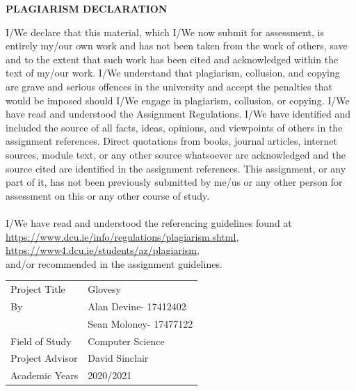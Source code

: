 \documentclass[12pt,a4paper,oneside]{book}
\theoremstyle{plain}
\numberwithin{equation}{chapter}
\begin{document}
\newpage
{}
\begin{center}
    \large\textbf{PLAGIARISM DECLARATION}
\end{center}
\noindent I/We declare that this material, which I/We now submit for assessment, is entirely my/our own work and has not been taken from the work of others, save and to the extent that such work has been cited and acknowledged within the text of my/our work. I/We understand that plagiarism, collusion, and copying are grave and serious offences in the university and accept the penalties that would be imposed should I/We engage in plagiarism, collusion, or copying. I/We have read and understood the Assignment Regulations. I/We have identified and included the source of all facts, ideas, opinions, and viewpoints of others in the assignment references. Direct quotations from books, journal articles, internet sources, module text, or any other source whatsoever are acknowledged and the source cited are identified in the assignment references. This assignment, or any part of it, has not been previously submitted by me/us or any other person for assessment on this or any other course of study. \\
\\
I/We have read and understood the referencing guidelines found at \\
\url{https://www.dcu.ie/info/regulations/plagiarism.shtml}, \\
\url{https://www4.dcu.ie/students/az/plagiarism}, \\
and/or recommended in the assignment guidelines.

\begin{table}[h]
	\begin{tabular}{ll}
        Project Title       & Glovesy  \\
        By                  & Alan Devine\hspace{5mm}- 17412402\\
                            & Sean Moloney\hspace{2mm}- 17477122\\
        Field of Study      & Computer Science \\
        Project Advisor	    & David Sinclair \\
        Academic Years      & 2020/2021 \\
	\end{tabular}
\end{table}
\end{document}
